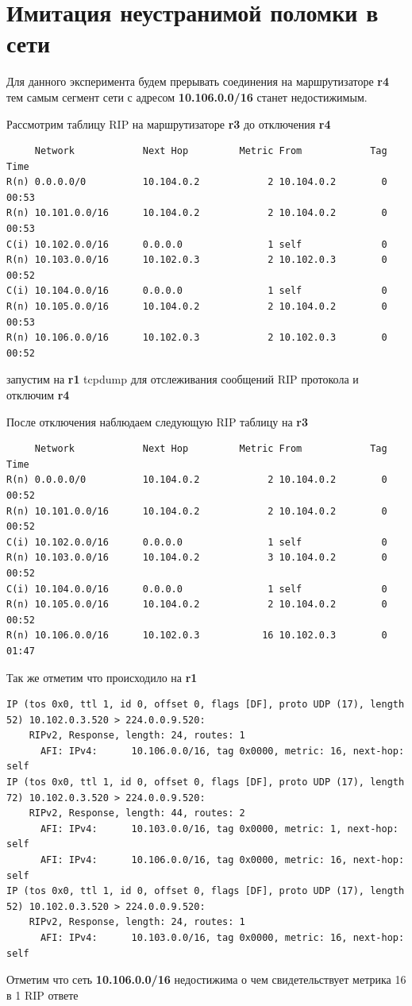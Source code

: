 \documentclass[a4paper,12pt]{article}
\begin{document}
\section{Имитация неустранимой поломки в сети}

Для данного эксперимента будем прерывать соединения на маршрутизаторе \textbf{r4} тем самым сегмент сети с адресом \textbf{10.106.0.0/16}
станет недостижимым. 

Рассмотрим таблицу RIP на маршрутизаторе \textbf{r3} до отключения \textbf{r4}
\begin{verbatim}
     Network            Next Hop         Metric From            Tag Time
R(n) 0.0.0.0/0          10.104.0.2            2 10.104.0.2        0 00:53
R(n) 10.101.0.0/16      10.104.0.2            2 10.104.0.2        0 00:53
C(i) 10.102.0.0/16      0.0.0.0               1 self              0
R(n) 10.103.0.0/16      10.102.0.3            2 10.102.0.3        0 00:52
C(i) 10.104.0.0/16      0.0.0.0               1 self              0
R(n) 10.105.0.0/16      10.104.0.2            2 10.104.0.2        0 00:53
R(n) 10.106.0.0/16      10.102.0.3            2 10.102.0.3        0 00:52    
\end{verbatim}

запустим на \textbf{r1} tcpdump для отслеживания сообщений RIP протокола и отключим \textbf{r4}

После отключения наблюдаем следующую RIP таблицу на \textbf{r3}
\begin{verbatim}
     Network            Next Hop         Metric From            Tag Time
R(n) 0.0.0.0/0          10.104.0.2            2 10.104.0.2        0 00:52
R(n) 10.101.0.0/16      10.104.0.2            2 10.104.0.2        0 00:52
C(i) 10.102.0.0/16      0.0.0.0               1 self              0
R(n) 10.103.0.0/16      10.104.0.2            3 10.104.0.2        0 00:52
C(i) 10.104.0.0/16      0.0.0.0               1 self              0
R(n) 10.105.0.0/16      10.104.0.2            2 10.104.0.2        0 00:52
R(n) 10.106.0.0/16      10.102.0.3           16 10.102.0.3        0 01:47    
\end{verbatim}

Так же отметим что происходило на \textbf{r1}
\begin{verbatim}
IP (tos 0x0, ttl 1, id 0, offset 0, flags [DF], proto UDP (17), length 52) 10.102.0.3.520 > 224.0.0.9.520: 
	RIPv2, Response, length: 24, routes: 1
	  AFI: IPv4:      10.106.0.0/16, tag 0x0000, metric: 16, next-hop: self
IP (tos 0x0, ttl 1, id 0, offset 0, flags [DF], proto UDP (17), length 72) 10.102.0.3.520 > 224.0.0.9.520: 
	RIPv2, Response, length: 44, routes: 2
	  AFI: IPv4:      10.103.0.0/16, tag 0x0000, metric: 1, next-hop: self
	  AFI: IPv4:      10.106.0.0/16, tag 0x0000, metric: 16, next-hop: self
IP (tos 0x0, ttl 1, id 0, offset 0, flags [DF], proto UDP (17), length 52) 10.102.0.3.520 > 224.0.0.9.520: 
	RIPv2, Response, length: 24, routes: 1
	  AFI: IPv4:      10.103.0.0/16, tag 0x0000, metric: 16, next-hop: self
\end{verbatim}
Отметим что сеть \textbf{10.106.0.0/16} недостижима о чем свидетельствует метрика 16 в 1 RIP ответе
\end{document}
